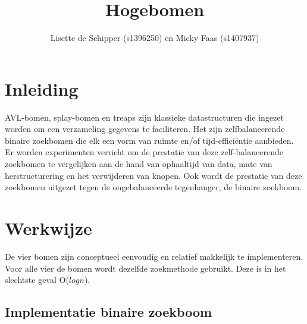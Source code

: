 \documentclass[a4paper,10pt]{article}
\title{ Hogebomen }
\author{ Lisette de Schipper (s1396250) en Micky Faas (s1407937) }
\date{}
\begin{document}
\maketitle

\section{Inleiding}
AVL-bomen, splay-bomen en treaps zijn klassieke datastructuren die ingezet worden om een verzameling gegevens te faciliteren. Het zijn zelfbalancerende binaire zoekbomen die elk een vorm van ruimte en/of tijd-effici\"entie aanbieden. Er worden experimenten verricht om de prestatie van deze zelf-balancerende zoekbomen te vergelijken aan de hand van ophaaltijd van data, mate van herstructurering en het verwijderen van knopen. Ook wordt de prestatie van deze zoekbomen uitgezet tegen de ongebalanceerde tegenhanger, de binaire zoekboom.

\section{Werkwijze}
De vier bomen zijn conceptueel eenvoudig en relatief makkelijk te implementeren. Voor alle vier de bomen wordt dezelfde zoekmethode gebruikt. Deze is in het slechtste geval O($logn$).
\subsection{Implementatie binaire zoekboom}
\end{document}
